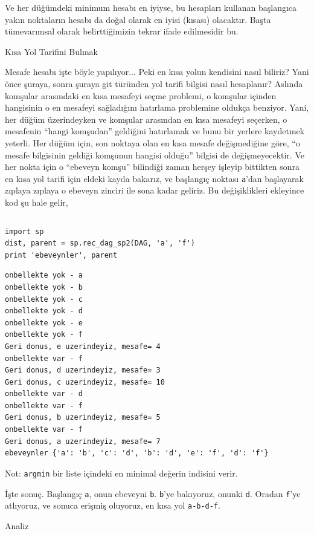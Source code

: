 \documentclass[12pt,fleqn]{article}\usepackage{../../common}
\begin{document}
Ve her düğümdeki minimum hesabı en iyiyse, bu hesapları kullanan başlangıca
yakın noktaların hesabı da doğal olarak en iyisi (kısası) olacaktır. Başta
tümevarımsal olarak belirttiğimizin tekrar ifade edilmesidir bu. 

Kısa Yol Tarifini Bulmak

Mesafe hesabı işte böyle yapılıyor... Peki en kısa yolun kendisini nasıl
biliriz? Yani önce şuraya, sonra şuraya git türünden yol tarifi bilgisi
nasıl hesaplanır? Aslında komşular arasındaki en kısa mesafeyi seçme
problemi, o komşular içinden hangisinin o en mesafeyi sağladığını hatırlama
problemine oldukça benziyor. Yani, her düğüm üzerindeyken ve komşular
arasından en kısa mesafeyi seçerken, o mesafenin ``hangi komşudan''
geldiğini hatırlamak ve bunu bir yerlere kaydetmek yeterli. Her düğüm için,
son noktaya olan en kısa mesafe değişmediğine göre, ``o mesafe bilgisinin
geldiği komşunun hangisi olduğu'' bilgisi de değişmeyecektir. Ve her nokta
için o ``ebeveyn komşu'' bilindiği zaman herşey işleyip bittikten sonra en
kısa yol tarifi için eldeki kayda bakarız, ve başlangıç noktası
\verb!a!'dan başlayarak zıplaya zıplaya o ebeveyn zinciri ile sona kadar
geliriz. Bu değişiklikleri ekleyince kod şu hale gelir,

\inputminted[fontsize=\footnotesize]{python}{sp.py}

\begin{verbatim}
import sp
dist, parent = sp.rec_dag_sp2(DAG, 'a', 'f')
print 'ebeveynler', parent
\end{verbatim}

\begin{verbatim}
onbellekte yok - a
onbellekte yok - b
onbellekte yok - c
onbellekte yok - d
onbellekte yok - e
onbellekte yok - f
Geri donus, e uzerindeyiz, mesafe= 4
onbellekte var - f
Geri donus, d uzerindeyiz, mesafe= 3
Geri donus, c uzerindeyiz, mesafe= 10
onbellekte var - d
onbellekte var - f
Geri donus, b uzerindeyiz, mesafe= 5
onbellekte var - f
Geri donus, a uzerindeyiz, mesafe= 7
ebeveynler {'a': 'b', 'c': 'd', 'b': 'd', 'e': 'f', 'd': 'f'}
\end{verbatim}

Not: \verb!argmin! bir liste içindeki en minimal değerin indisini verir. 

İşte sonuç. Başlangıç \verb!a!, onun ebeveyni \verb!b!. \verb!b!'ye
bakıyoruz, onunki \verb!d!. Oradan \verb!f!'ye atlıyoruz, ve sonuca erişmiş
oluyoruz, en kısa yol \verb!a-b-d-f!. 

Analiz
\end{document}
